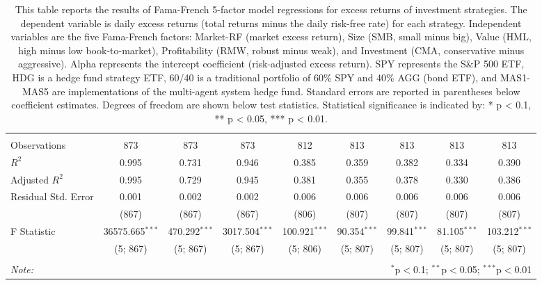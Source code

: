 \begin{table}[!htbp]
\begin{tabular}{@{\extracolsep{5pt}}lcccccccc}
\hline \\[-1.8ex]
 Observations & 873 & 873 & 873 & 812 & 813 & 813 & 813 & 813 \\
 $R^2$ & 0.995 & 0.731 & 0.946 & 0.385 & 0.359 & 0.382 & 0.334 & 0.390 \\
 Adjusted $R^2$ & 0.995 & 0.729 & 0.945 & 0.381 & 0.355 & 0.378 & 0.330 & 0.386 \\
 Residual Std. Error & 0.001 & 0.002 & 0.002 & 0.006 & 0.006 & 0.006 & 0.006 & 0.006 \\
 & (867) & (867) & (867) & (806) & (807) & (807) & (807) & (807) \\
 F Statistic & 36575.665$^{***}$ & 470.292$^{***}$ & 3017.504$^{***}$ & 100.921$^{***}$ & 90.354$^{***}$ & 99.841$^{***}$ & 81.105$^{***}$ & 103.212$^{***}$ \\
 & (5; 867) & (5; 867) & (5; 867) & (5; 806) & (5; 807) & (5; 807) & (5; 807) & (5; 807) \\
\hline
\hline \\[-1.8ex]
\textit{Note:} & \multicolumn{8}{r}{$^{*}$p$<$0.1; $^{**}$p$<$0.05; $^{***}$p$<$0.01} \\
\end{tabular}
\caption[Fama-French 5-Factor Model Results]{This table reports the results of Fama-French 5-factor model regressions for excess returns of investment strategies. The dependent variable is daily excess returns (total returns minus the daily risk-free rate) for each strategy. Independent variables are the five Fama-French factors: Market-RF (market excess return), Size (SMB, small minus big), Value (HML, high minus low book-to-market), Profitability (RMW, robust minus weak), and Investment (CMA, conservative minus aggressive). Alpha represents the intercept coefficient (risk-adjusted excess return). SPY represents the S\&P 500 ETF, HDG is a hedge fund strategy ETF, 60/40 is a traditional portfolio of 60\% SPY and 40\% AGG (bond ETF), and MAS1-MAS5 are implementations of the multi-agent system hedge fund. Standard errors are reported in parentheses below coefficient estimates. Degrees of freedom are shown below test statistics. Statistical significance is indicated by: * p < 0.1, ** p < 0.05, *** p < 0.01.}
\label{tab:fama_french_5factor}
\end{table}
